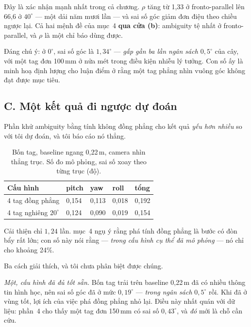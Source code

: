 \documentclass[../../marker.tex]{subfiles}
\begin{document}
Đây là xác nhận mạnh nhất trong cả chương. \(\rho\) tăng từ 1,33 ở fronto-parallel lên 66,6 ở \(40^\circ\) --- một dải năm mươi lần --- và sai số góc giảm đơn điệu theo chiều ngược lại. Cả hai mệnh đề của  mục~4 \textbf{qua cửa (b)}: ambiguity tệ nhất ở fronto-parallel, và \(\rho\) là một chỉ báo dùng được.

Đáng chú ý: ở \(0^\circ\), sai số góc là \(1{,}34^\circ\) --- \emph{gấp gần ba lần ngân sách \(0{,}5^\circ\)} của cây, với một tag đơn 100\,mm ở nửa mét trong điều kiện nhiễu lý tưởng. Con số ấy là minh hoạ định lượng cho luận điểm ở  rằng một tag phẳng nhìn vuông góc không đạt được mục tiêu.

\subsection{C. Một kết quả đi ngược dự đoán}

Phần khử ambiguity bằng tính không đồng phẳng cho kết quả \emph{yếu hơn nhiều} so với tôi dự đoán, và tôi báo cáo nó thẳng.

\begin{table}[H]\centering\small
\caption{Bốn tag, baseline ngang 0,22\,m, camera nhìn thẳng trục. Số đo mô phỏng, sai số xoay theo từng trục (độ).}
\label{tab:c16-tilt}
\begin{tabularx}{\linewidth}{@{}L{4.6cm}L{1.8cm}L{1.8cm}L{1.8cm}Y@{}}
\toprule
Cấu hình & pitch & yaw & roll & tổng\\
 tag đồng phẳng & 0,154 & 0,113 & 0,018 & 0,192\\
4 tag nghiêng \(20^\circ\) & 0,124 & 0,090 & 0,019 & 0,154\\
\bottomrule
\end{tabularx}
\end{table}

Cải thiện chỉ \(1{,}24\) lần.  mục~4 ngụ ý rằng phá tính đồng phẳng là bước có đòn bẩy rất lớn; con số này nói rằng --- \emph{trong cấu hình cụ thể đã mô phỏng} --- nó chỉ cho khoảng 24\%.

Ba cách giải thích, và tôi chưa phân biệt được chúng.

\emph{Một, cấu hình đã đủ tốt sẵn.} Bốn tag trải trên baseline 0,22\,m đã có nhiều thông tin hình học, nên sai số góc đã ở mức \(0{,}19^\circ\) --- \emph{trong ngân sách} \(0{,}5^\circ\) rồi. Khi đã ở vùng tốt, lợi ích của việc phá đồng phẳng nhỏ lại. Điều này nhất quán với dữ liệu: phần~4 cho thấy một tag đơn 150\,mm có sai số \(0{,}43^\circ\), và \emph{đó} mới là chỗ cần cứu.
\end{document}
